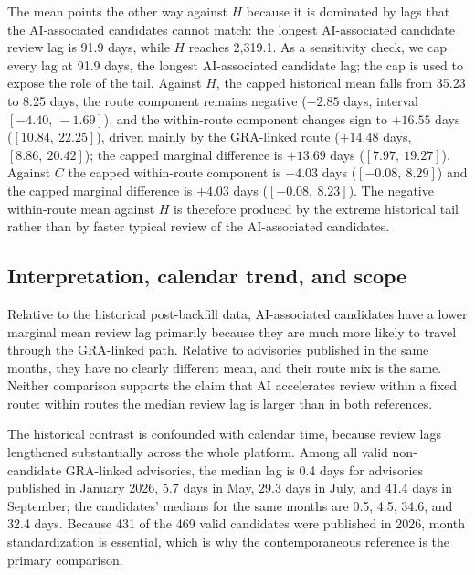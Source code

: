 \documentclass[smallextended,natbib]{svjour3}
\begin{document}
The mean points the other way against $H$ because it is dominated by lags that the AI-associated  
candidates cannot match: the longest  AI-associated candidate review lag is
91.9 days, while $H$ reaches 2{,}319.1.  As a sensitivity check, we cap every
lag at 91.9 days, the longest AI-associated candidate lag; the cap is 
used   to expose the role of the tail.  Against $H$, the capped historical
mean falls from 35.23 to 8.25 days, the route component remains negative
($-2.85$ days, interval $[-4.40,\ -1.69]$), and the within-route component
changes sign to $+16.55$ days ($[10.84,\ 22.25]$), driven mainly by the
GRA-linked route ($+14.48$ days, $[8.86,\ 20.42]$); the capped marginal
difference is $+13.69$ days ($[7.97,\ 19.27]$).  Against $C$ the capped
within-route component is $+4.03$ days ($[-0.08,\ 8.29]$) and the capped marginal
difference is $+4.03$ days ($[-0.08,\ 8.23]$).  The negative within-route mean
against $H$ is therefore produced by the extreme historical tail rather than
by faster typical review of the AI-associated   candidates.  


\subsection{Interpretation, calendar trend, and scope}
\label{sec:comparison-scope}

Relative to the
historical post-backfill data, AI-associated candidates have a lower marginal
mean review lag primarily because they are much more likely to travel
through the GRA-linked path.   
Relative to advisories published in the same
months, they have no clearly different mean, and their route mix is the same.
Neither comparison supports the claim that AI accelerates review within a fixed
route: within routes the median review lag is larger than in both references.

The historical contrast is confounded with calendar time, because review lags
lengthened substantially across the whole platform.  Among all valid
non-candidate GRA-linked advisories, the median lag is 0.4 days for advisories
published in January 2026, 5.7 days in May, 29.3 days in July, and 41.4 days in
September; the candidates' medians for the same months are 0.5, 4.5, 34.6, and
32.4 days.  Because 431 of the 469 valid candidates were published in 2026,
month standardization is essential, which is why the contemporaneous reference
is the primary comparison. 
\end{document}
